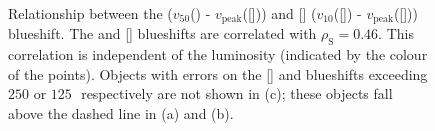\begin{figure}
\captionsetup[subfigure]{labelformat=empty}
\centering 
    \subfloat[\label{fig:oiii_civ_blueshifts_a}]{}
    \subfloat[\label{fig:oiii_civ_blueshifts_b}]{}
    \subfloat[\label{fig:oiii_civ_blueshifts_c}]{}
    \caption[{Relationship between the  and [] blueshifts.}]{Relationship between the  ($v_{50}$() - $v_{\text{peak}}$([])) and [] ($v_{10}$([]) - $v_{\text{peak}}$([])) blueshift. The  and [] blueshifts are correlated with $\rho_{\text{S}}=0.46$. This correlation is independent of the luminosity (indicated by the colour of the points). Objects with errors on the [] and  blueshifts exceeding $250$ or $125$\,\kms\, respectively are not shown in (c); these objects fall above the dashed line in (a) and (b). }     
    \label{fig:oiii_civ_blueshifts}
\end{figure}

